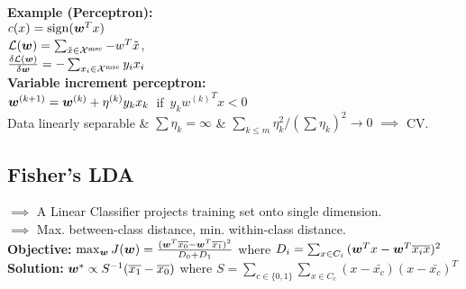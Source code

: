 
\textbf{Example (Perceptron):}\\
$c(x) = \mathrm{sign}({\bm{w}}^Tx)$\\
$\mathcal{L}({\bm{w}})=\sum_{\tilde{x}\in\mathcal{X}^\text{msc}}-w^T\tilde{x}$,\\
$\frac{\delta\mathcal{L}({\bm{w}})}{\delta{\bm{w}}} = -\sum_{x_i\in\mathcal{X}^\text{msc}}y_ix_i$\\
\textbf{Variable increment perceptron:}\\
\mbox{\hspace{-0.5em}${\bm{w}}^{(k+1)}={\bm{w}}^{(k)}+\eta^{(k)}y_kx_k $ if $y_k{w^{(k)}}^Tx < 0$}\\
Data linearly separable \& $\sum \eta_k = \infty$ \& ${\sum_{k\leq m}\eta_k^2}/{(\sum\eta_k)^2}\to 0$ $\implies$ CV. 
\subsection*{Fisher's LDA}
$\implies$ A Linear Classifier projects training set onto
single dimension.\\
$\implies$ Max. between-class distance, min. within-class distance.\\
\textbf{Objective:} \mbox{$\max_{\bm{w}} J({\bm{w}}) = \frac{({\bm{w}}^T\overline{x_0} - {\bm{w}}^T\overline{x_1})^2}{D_0+D_1}$}
where $D_i = \sum_{x\in C_i}{({\bm{w}}^Tx - {\bm{w}}^T\overline{x_ix})^2}$\\
\textbf{Solution:}
${\bm{w}}^* \propto S^{-1}(\overline{x_1}-\overline{x_0})$ where $S = \sum_{c\in\{0,1\}}\sum_{x\in C_c}(x-\bar{x_c})(x-\bar{x_c})^T$

